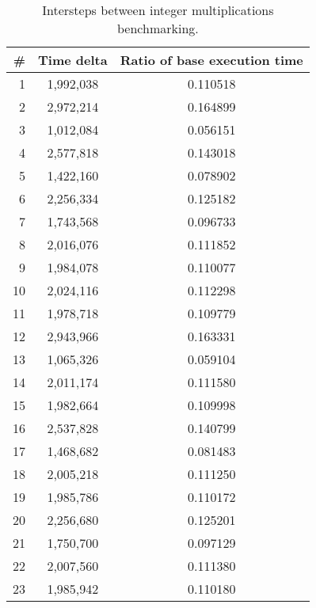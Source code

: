 \begin{table}
\centering
\begin{tabular}{rcc}
\# & Time delta & Ratio of base execution time\\
\hline
1 & 1,992,038 & 0.110518 \\
2 & 2,972,214 & 0.164899 \\
3 & 1,012,084 & 0.056151 \\
4 & 2,577,818 & 0.143018 \\
5 & 1,422,160 & 0.078902 \\
6 & 2,256,334 & 0.125182 \\
7 & 1,743,568 & 0.096733 \\
8 & 2,016,076 & 0.111852 \\
9 & 1,984,078 & 0.110077 \\
10 & 2,024,116 & 0.112298 \\
11 & 1,978,718 & 0.109779 \\
12 & 2,943,966 & 0.163331 \\
13 & 1,065,326 & 0.059104 \\
14 & 2,011,174 & 0.111580 \\
15 & 1,982,664 & 0.109998 \\
16 & 2,537,828 & 0.140799 \\
17 & 1,468,682 & 0.081483 \\
18 & 2,005,218 & 0.111250 \\
19 & 1,985,786 & 0.110172 \\
20 & 2,256,680 & 0.125201 \\
21 & 1,750,700 & 0.097129 \\
22 & 2,007,560 & 0.111380 \\
23 & 1,985,942 & 0.110180 \\
\end{tabular}
\captionsetup{justification=centering}
\caption{Intersteps between integer multiplications benchmarking.}
\end{table}
